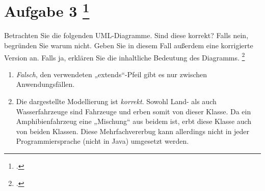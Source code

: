 \documentclass{lehramt-informatik-aufgabe}
\begin{document}

\section{Aufgabe 3
\footcite[Thema 1 Teilaufgabe 1 Aufgabe 3]{examen:46116:2017:03}}

Betrachten Sie die folgenden UML-Diagramme. Sind diese korrekt? Falls
nein, begründen Sie warum nicht. Geben Sie in diesem Fall außerdem eine
korrigierte Version an. Falls ja, erklären Sie die inhaltliche Bedeutung
des Diagramms.
\footcite[Aufgabe 2]{sosy:ab:3}

\begin{enumerate}
\item \strut


\begin{liAntwort}
\emph{Falsch}, den verwendeten „extends“-Pfeil gibt es nur zwischen
Anwendungsfällen.

\end{liAntwort}

\item \strut


\begin{liAntwort}
Die dargestellte Modellierung ist \emph{korrekt}. Sowohl Land- als auch
Wasserfahrzeuge sind Fahrzeuge und erben somit von dieser Klasse. Da
ein Amphibienfahrzeug eine „Mischung“ aus beidem ist, erbt diese Klasse
auch von beiden Klassen. Diese Mehrfachvererbug kann allerdings nicht
in jeder Programmiersprache (\zB nicht in Java) umgesetzt
werden.
\end{liAntwort}


\end{enumerate}
\end{document}
